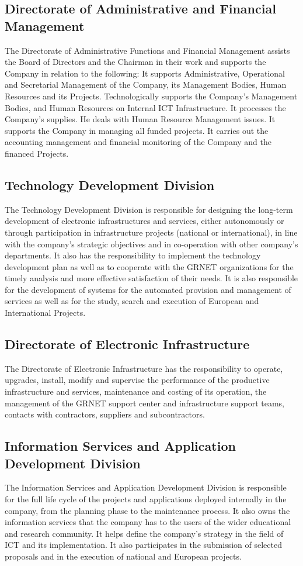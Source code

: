 \subsection{Directorate of Administrative and Financial Management}
The Directorate of Administrative Functions and Financial Management assists the Board of Directors and the Chairman
in their work and supports the Company in relation to the following:
It supports Administrative, Operational and Secretarial Management of the Company,
its Management Bodies, Human Resources and its Projects. Technologically supports the Company's Management Bodies,
and Human Resources on Internal ICT Infrastructure.
It processes the Company's supplies.
He deals with Human Resource Management issues.
It supports the Company in managing all funded projects.
It carries out the accounting management and financial monitoring of the Company and the financed Projects.

\subsection{Technology Development Division}
The Technology Development Division is responsible for designing the long-term development of electronic infrastructures and services,
either autonomously or through participation in infrastructure projects (national or international),
in line with the company's strategic objectives and in co-operation with other company's departments.
It also has the responsibility to implement the technology development plan
as well as to cooperate with the GRNET organizations for the timely analysis
and more effective satisfaction of their needs.
It is also responsible for the development of systems for the automated provision
and management of services as well as for the study, search and execution of European and International Projects.

\subsection{Directorate of Electronic Infrastructure}
The Directorate of Electronic Infrastructure has the responsibility to operate, upgrades, install, modify
and supervise the performance of the productive infrastructure and services,
maintenance and costing of its operation, the management of the GRNET support center and infrastructure support teams,
contacts with contractors, suppliers and subcontractors.

\subsection{Information Services and Application Development Division}
The Information Services and Application Development Division is responsible for the full life cycle of the projects
and applications deployed internally in the company, from the planning phase to the maintenance process.
It also owns the information services that the company has to the users of the wider educational and research community.
It helps define the company's strategy in the field of ICT and its implementation.
It also participates in the submission of selected proposals and in the execution of national and European projects.

